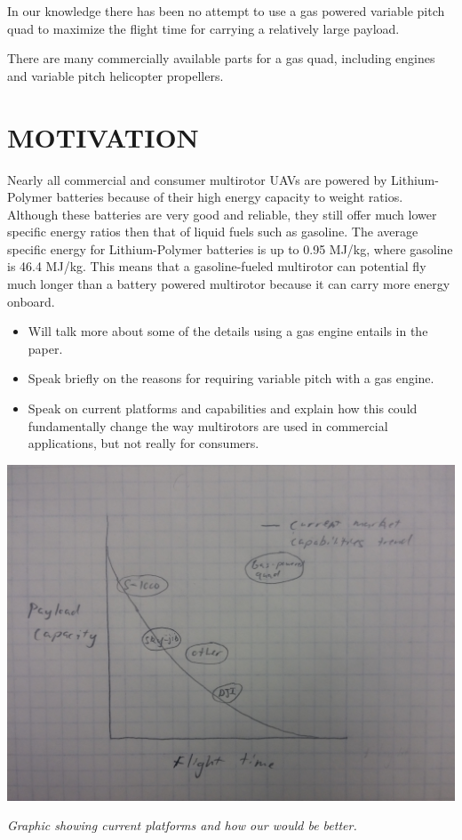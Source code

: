 \documentclass[letterpaper, 10 pt, conference]{ieeeconf}  %
\makeatletter
\newenvironment{figurehere}
  {\def\@captype{figure}}
  {}
\makeatother
\begin{document}
In our knowledge there has been no attempt to use a gas powered variable pitch quad to maximize the flight time for carrying a relatively large payload. 

There are many commercially available parts for a gas quad, including engines and variable pitch helicopter propellers. 

\section{MOTIVATION}

Nearly all commercial and consumer multirotor UAVs are powered by Lithium-Polymer batteries because of their high energy capacity to weight ratios. Although these batteries are very good and reliable, they still offer much lower specific energy ratios then that of liquid fuels such as gasoline. The average specific energy for Lithium-Polymer batteries is up to 0.95 MJ/kg, where gasoline is 46.4 MJ/kg. This means that a gasoline-fueled multirotor can potential fly much longer than a battery powered multirotor because it can carry more energy onboard. 

\begin{itemize}
	\item{Will talk more about some of the details using a gas engine entails in the paper.}
	\item{Speak briefly on the reasons for requiring variable pitch with a gas engine.} 
	\item{Speak on current platforms and capabilities and explain how this could fundamentally change the way multirotors are used in commercial applications, but not really for consumers.}
\end{itemize}


\begin{figurehere}
	\begin{center}
		\includegraphics[width=.40\textwidth]{current_capabilities.jpg}
		\caption{\textit{Graphic showing current platforms and how our would be better.}}
		\label{current_cap}
	\end{center}
\end{figurehere}
\end{document}
